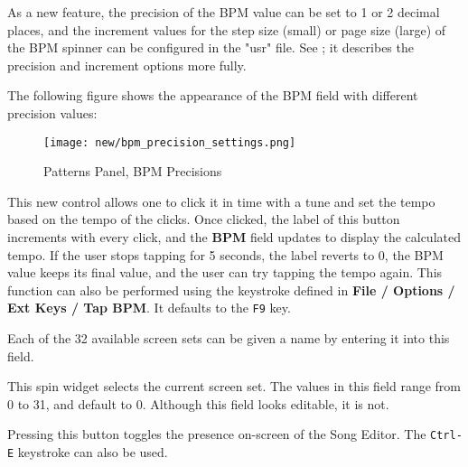    As a new feature, the precision of the BPM value can be set to 1 or 2
   decimal places, and the increment values for the step size (small)
   or page size (large) of the BPM spinner can be configured in the "usr" file.
   See ; it describes
   the precision and increment options more fully.

   The following figure shows the appearance of the BPM field with different
   precision values:

\begin{figure}[H]
   \centering 
   \texttt{[image: new/bpm\_precision\_settings.png]}
   \caption{Patterns Panel, BPM Precisions}
   \label{fig:pattern_window_bpm_precision_settings.png}
\end{figure}

   This new control allows one to click it in time with a tune and set the
   tempo based on the tempo of the clicks.  Once clicked, the label of this
   button increments with every click, and the \textbf{BPM} field updates to
   display the calculated tempo.  If the user stops tapping for 5 seconds, the
   label reverts to 0, the BPM value keeps its final value, and the user can
   try tapping the tempo again.
   This function can also be performed using the keystroke defined
   in \textbf{File / Options / Ext Keys / Tap BPM}.  It defaults
   to the \texttt{F9} key.

   Each of the 32 available screen sets can be given a name by entering it
   into this field.

%

   This spin widget selects the current screen set.  The values in this
   field range from 0 to 31, and default to 0.
   Although this field looks editable, it is not.

%

   Pressing this button toggles the presence on-screen of the Song
   Editor.  The \texttt{Ctrl-E} keystroke can also be used.

